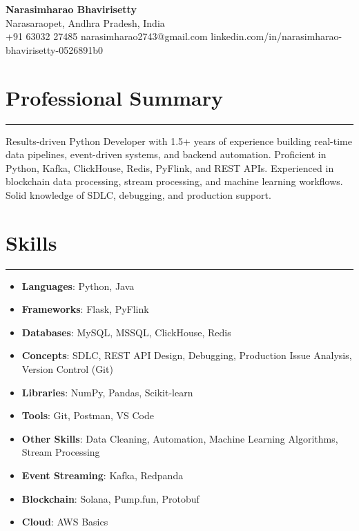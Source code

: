 \documentclass[12pt]{article}
\begin{document}
\begin{center}
  {\huge\textbf{Narasimharao Bhavirisetty}}\\[3pt]
  Narasaraopet, Andhra Pradesh, India \\[1pt]
  +91 63032 27485 \textbullet{} narasimharao2743@gmail.com \textbullet{}
  linkedin.com/in/narasimharao-bhavirisetty-0526891b0
\end{center}

\vspace{6pt}

\section*{Professional Summary}
\vspace{1pt}\hrule\vspace{4pt}
Results-driven Python Developer with 1.5+ years of experience building real-time data pipelines, event-driven systems, and backend automation. Proficient in Python, Kafka, ClickHouse, Redis, PyFlink, and REST APIs. Experienced in blockchain data processing, stream processing, and machine learning workflows. Solid knowledge of SDLC, debugging, and production support.

\section*{Skills}
\vspace{1pt}\hrule\vspace{4pt}
\begin{itemize}
  \item \textbf{Languages}: Python, Java
  \item \textbf{Frameworks}: Flask, PyFlink
  \item \textbf{Databases}: MySQL, MSSQL, ClickHouse, Redis
  \item \textbf{Concepts}: SDLC, REST API Design, Debugging, Production Issue Analysis, Version Control (Git)
  \item \textbf{Libraries}: NumPy, Pandas, Scikit-learn
  \item \textbf{Tools}: Git, Postman, VS Code
  \item \textbf{Other Skills}: Data Cleaning, Automation, Machine Learning Algorithms, Stream Processing
  \item \textbf{Event Streaming}: Kafka, Redpanda
  \item \textbf{Blockchain}: Solana, Pump.fun, Protobuf
  \item \textbf{Cloud}: AWS Basics
\end{itemize}
\end{document}
